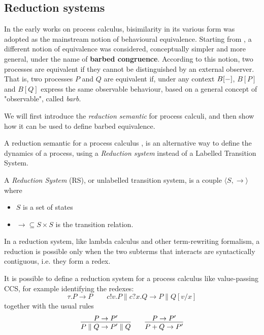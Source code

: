 \subsection{Reduction systems}\label{bkg_reduction_system}

In the early works on process calculus, bisimilarity in its various form was adopted as the mainstream notion of behavioural equivalence. Starting from \cite{milnerBarbedBisimulation1992}, a different notion of equivalence was considered, conceptually simpler and more general, under the name
of \textbf{barbed congruence}. According to this notion, two processes are equivalent if they cannot be distinguished by an external observer. That is, two processes $P$ and $Q$ are equivalent if, under any context $B[{-}]$, $B[P]$ and $B[Q]$ express the same observable behaviour, based on a general concept of "observable", called \textit{barb}.

We will first introduce the \textit{reduction semantic} for process calculi, and then show how it can be used to define barbed equivalence. 

A reduction semantic for a process calculus \cite{milnerFunctionsProcesses1990, berryChemicalAbstractMachine1989}, is an alternative way to define the dynamics of a process, using a \textit{Reduction system} instead of a Labelled Transition System. 

A \textit{Reduction System} (RS), or unlabelled transition system, is a couple $\langle S,  \rightarrow \rangle$ where \begin{itemize}
\item $S$ is a set of states
\item $\rightarrow 	\subseteq S\times S$ is the transition relation.
\end{itemize} 

In a reduction system, like lambda calculus and other term-rewriting formalism, a reduction is possible only when the two subterms that interacts are syntactically contiguous, i.e. they form a redex. 

It is possible to define a reduction system for a process calculus like value-passing CCS, for example identifying the redexes:
\[ \tau.P \rightarrow P \qquad c!v.P \parallel c?x.Q \rightarrow P \parallel Q[v/x]\]
together with the usual rules
\[ \infer{P \parallel Q \rightarrow P'\parallel Q}{P \rightarrow P'}
\qquad
\infer{P + Q \rightarrow P'}{P \rightarrow P'}\]

